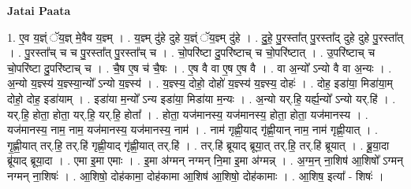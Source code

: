 \documentclass[17pt]{extarticle}
\begin{document}
\textbf{Jatai Paata} \newline

1. ए॒व य॒ज्ञ्ं ॅय॒ज्ञ् मे॒वैव य॒ज्ञ्म् । . य॒ज्ञ्म् दु॑हे दुहे य॒ज्ञ्ं ॅय॒ज्ञ्म् दु॑हे । . दु॒हे॒ पु॒रस्ता᳚त् पु॒रस्ता᳚द् दुहे दुहे पु॒रस्ता᳚त् । . पु॒रस्ता᳚च् च च पु॒रस्ता᳚त् पु॒रस्ता᳚च् च । . चो॒परि॑ष्टा दु॒परि॑ष्टाच् च चो॒परि॑ष्टात् । . उ॒परि॑ष्टाच् च चो॒परि॑ष्टा दु॒परि॑ष्टाच् च । . चै॒ष ए॒ष च॑ चै॒षः । . ए॒ष वै वा ए॒ष ए॒ष वै । . वा अ॒न्यो᳚ ऽन्यो वै वा अ॒न्यः । . अ॒न्यो य॒ज्ञ्स्य॑ य॒ज्ञ्स्या॒न्यो᳚ ऽन्यो य॒ज्ञ्स्य॑ । . य॒ज्ञ्स्य॒ दोहो॒ दोहो॑ य॒ज्ञ्स्य॑ य॒ज्ञ्स्य॒ दोहः॑ । . दोह॒ इडा॑या॒ मिडा॑या॒म् दोहो॒ दोह॒ इडा॑याम् । . इडा॑या म॒न्यो᳚ ऽन्य इडा॑या॒ मिडा॑या म॒न्यः । . अ॒न्यो यर्.हि॒ यर्ह्य॒न्यो᳚ ऽन्यो यर्.हि॑ । . यर्.हि॒ होता॒ होता॒ यर्.हि॒ यर्.हि॒ होता᳚ । . होता॒ यज॑मानस्य॒ यज॑मानस्य॒ होता॒ होता॒ यज॑मानस्य । . यज॑मानस्य॒ नाम॒ नाम॒ यज॑मानस्य॒ यज॑मानस्य॒ नाम॑ । . नाम॑ गृह्णी॒याद् गृ॑ह्णी॒यान् नाम॒ नाम॑ गृह्णी॒यात् । . गृ॒ह्णी॒यात् तर्.हि॒ तर्.हि॑ गृह्णी॒याद् गृ॑ह्णी॒यात् तर्.हि॑ । . तर्.हि॑ ब्रूयाद् ब्रूया॒त् तर्.हि॒ तर्.हि॑ ब्रूयात् । . ब्रू॒या॒दा ब्रू॑याद् ब्रूया॒दा । . एमा इ॒मा एमाः । . इ॒मा अ॑ग्मन् नग्मन् नि॒मा इ॒मा अ॑ग्मन्न् । . अ॒ग्म॒न् ना॒शिष॑ आ॒शिषो᳚ ऽग्मन् नग्मन् ना॒शिषः॑ । . आ॒शिषो॒ दोह॑कामा॒ दोह॑कामा आ॒शिष॑ आ॒शिषो॒ दोह॑कामाः । . आ॒शिष॒ इत्या᳚ - शिषः॑ । \newline
\end{document}
